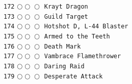 \documentclass[a4paper,landscape]{article}
\begin{document}
\begin{multicols*}{5}
\texttt{172} \(\bigcirc\!\bigcirc\!\bigcirc\)  \texttt{Krayt Dragon} \vspace{-0.3mm}\\ 
\texttt{173} \(\bigcirc\!\bigcirc\!\bigcirc\)  \texttt{Guild Target} \vspace{-0.3mm}\\ 
\texttt{174} \(\bigcirc\!\bigcirc\!\bigcirc\)  \texttt{Hotshot D, L-44 Blaster} \vspace{-0.3mm}\\ 
\texttt{175} \(\bigcirc\!\bigcirc\!\bigcirc\)  \texttt{Armed to the Teeth} \vspace{-0.3mm}\\ 
\texttt{176} \(\bigcirc\!\bigcirc\!\bigcirc\)  \texttt{Death Mark} \vspace{-0.3mm}\\ 
\texttt{177} \(\bigcirc\!\bigcirc\!\bigcirc\)  \texttt{Vambrace Flamethrower} \vspace{-0.3mm}\\ 
\texttt{178} \(\bigcirc\!\bigcirc\!\bigcirc\)  \texttt{Daring Raid} \vspace{-0.3mm}\\ 
\texttt{179} \(\bigcirc\!\bigcirc\!\bigcirc\)  \texttt{Desperate Attack} \vspace{-0.3mm}\\ 

\end{multicols*}
\end{document}
